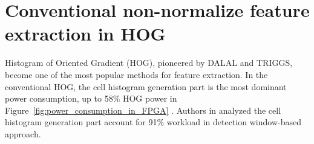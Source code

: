 %
%

\section{Conventional non-normalize feature extraction in HOG}
\label{sec:conventional_non_normalize_feature_extraction_in_hog}
Histogram of Oriented Gradient (HOG), pioneered by DALAL and
TRIGGS\cite{dalal2005hog},
become one of the most popular methods for feature extraction.
In the conventional HOG, the cell histogram generation part is the most dominant
power consumption, up to 58\% HOG power in
Figure~\ref{fig:power_consumption_in_FPGA} \cite{takagi2013sdh}.
Authors in\cite{mizuno2012ash} analyzed the cell histogram generation part account for 91\%
workload in detection window-based approach.

